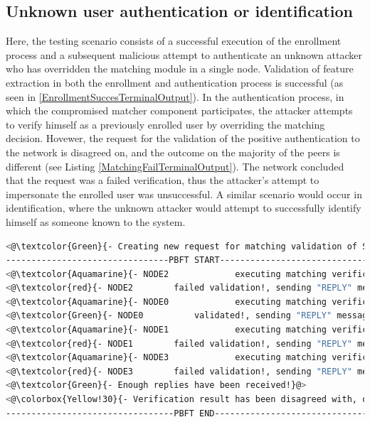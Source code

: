 \subsection{Unknown user authentication or identification}
\label{Unknown user authentication or identification}
Here, the testing scenario consists of a successful execution of the enrollment process and a subsequent malicious attempt to authenticate an unknown attacker who has overridden the matching module in a single node. Validation of feature extraction in both the enrollment and authentication process is successful (as seen in \ref{EnrollmentSuccesTerminalOutput}). In the authentication process, in which the compromised matcher component participates, the attacker attempts to verify himself as a previously enrolled user by overriding the matching decision. Hovewer, the request for the validation of the positive authentication to the network is disagreed on, and the outcome on the majority of the peers is different (see Listing \ref{MatchingFailTerminalOutput}). The network concluded that the request was a failed verification, thus the attacker's attempt to impersonate the enrolled user was unsuccessful. A similar scenario would occur in identification, where the unknown attacker would attempt to successfully identify himself as someone known to the system.
\begin{lstlisting}[language=bash, frame=single, caption={Terminal output for failed verification.},captionpos=b, label={MatchingFailTerminalOutput}]
<@\textcolor{Green}{- Creating new request for matching validation of SUCCESS verification!}@>
--------------------------------PBFT START---------------------------------
<@\textcolor{Aquamarine}{- NODE2			 executing matching verification}@>
<@\textcolor{red}{- NODE2 		 failed validation!, sending "REPLY" message!}@>
<@\textcolor{Aquamarine}{- NODE0			 executing matching verification}@>
<@\textcolor{Green}{- NODE0 		 validated!, sending "REPLY" message!}@>
<@\textcolor{Aquamarine}{- NODE1			 executing matching verification}@>
<@\textcolor{red}{- NODE1 		 failed validation!, sending "REPLY" message!}@>
<@\textcolor{Aquamarine}{- NODE3			 executing matching verification}@>
<@\textcolor{red}{- NODE3 		 failed validation!, sending "REPLY" message!}@>
<@\textcolor{Green}{- Enough replies have been received!}@>
<@\colorbox{Yellow!30}{- Verification result has been disagreed with, other outcome determined!}@>
---------------------------------PBFT END----------------------------------
\end{lstlisting}
